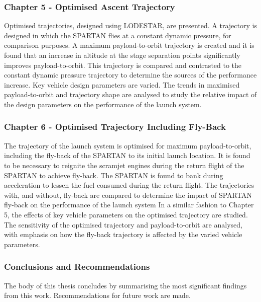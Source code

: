       \subsubsection*{Chapter 5 - Optimised Ascent Trajectory}
      
Optimised trajectories, designed using LODESTAR, are presented. A trajectory is designed in which the SPARTAN flies at a constant dynamic pressure, for comparison purposes. 
 A maximum payload-to-orbit trajectory is created and it is found that an increase in altitude at the stage separation points significantly improves payload-to-orbit.
 This trajectory is compared and contrasted to the constant dynamic pressure trajectory to determine the sources of the performance increase.  
 Key vehicle design parameters are varied. The trends in maximised payload-to-orbit and trajectory shape are analysed to study the relative impact of the design parameters on the performance of the launch system. 
 
 
      
      \subsubsection*{Chapter 6 - Optimised Trajectory Including Fly-Back}
      
      The trajectory of the launch system is optimised for maximum payload-to-orbit, including the fly-back of the SPARTAN to its initial launch location. 
      It is found to be necessary to reignite the scramjet engines during the return flight of the SPARTAN to achieve fly-back.
      The SPARTAN is found to bank during acceleration to lessen the fuel consumed during the return flight.
      The trajectories with, and without, fly-back are compared to determine the impact of SPARTAN fly-back on the performance of the launch system
      In a similar fashion to Chapter 5, the effects of key vehicle parameters on the optimised trajectory are studied. The sensitivity of the optimised trajectory and payload-to-orbit are analysed, with emphasis on how the fly-back trajectory is affected by the varied vehicle parameters.
      
     
      

    \subsubsection*{Conclusions and Recommendations}

      The body of this thesis concludes by summarising the most significant findings from this work. Recommendations for future work are made. 
      
